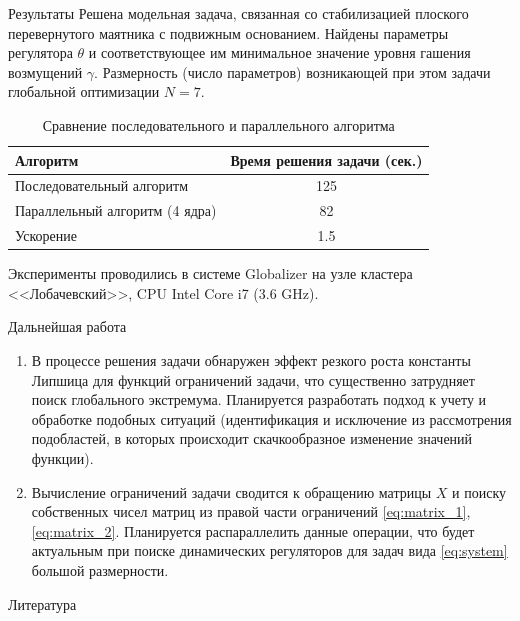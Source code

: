 \documentclass{beamer}
\begin{document}
\begin{frame}[t]
\begin{columns}[t]
\begin{column}[t]{0.48\paperwidth}
\begin{block}{Результаты}
						Решена модельная задача, связанная со стабилизацией плоского перевернутого маятника с подвижным основанием.
Найдены параметры регулятора $\theta$ и соответствующее им минимальное значение уровня гашения возмущений $\gamma$. 
Размерность (число параметров) возникающей при этом задачи глобальной оптимизации $N=7$.

          \begin{table}[h]
            \caption{Сравнение последовательного и параллельного алгоритма}
            \label{tab:Results}
            \begin{tabular}{l|c}
						  \hline
              Алгоритм & Время решения задачи (сек.) \\ 
              \hline
              Последовательный алгоритм  &  125 \\
              Параллельный алгоритм (4 ядра)  &  82 \\
              \hline
							Ускорение & 1.5 \\
							\hline
            \end{tabular}
           \end{table}
					
					Эксперименты проводились в системе Globalizer \cite{globalizer} на узле кластера <<Лобачевский>>, CPU Intel Core i7 (3.6 GHz).
          \end{block}
          \begin{block}{Дальнейшая работа}
						\begin{enumerate}
                \item В процессе решения задачи обнаружен эффект резкого роста константы Липшица для функций ограничений задачи, что существенно затрудняет поиск глобального экстремума.
Планируется разработать подход к учету и обработке подобных ситуаций (идентификация и исключение из рассмотрения подобластей, в которых происходит скачкообразное изменение значений функции).

                \item Вычисление ограничений задачи сводится к обращению матрицы $X$ и поиску собственных чисел матриц из правой части ограничений \eqref{eq:matrix_1}, \eqref{eq:matrix_2}. Планируется распараллелить данные операции, что будет актуальным при поиске динамических регуляторов для задач вида \eqref{eq:system} большой размерности.
						\end{enumerate}
          \end{block}
          \begin{block}{Литература}
            \printbibliography
          \end{block}
        \end{column}
    \end{columns}
\end{frame}
\end{document}
